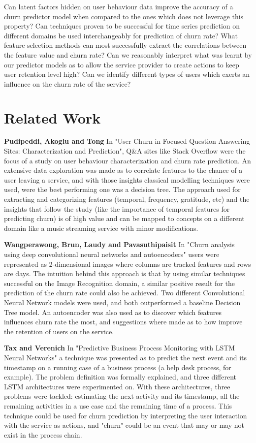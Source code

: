 \documentclass{kththesis}
\begin{document}
	Can latent factors hidden on user behaviour data improve the accuracy of a churn predictor model when compared to the ones which does not leverage this property? Can techniques proven to be successful for time series prediction on different domains be used interchangeably for prediction of churn rate? What feature selection methods can most successfully extract the correlations between the feature value and churn rate? Can we reasonably interpret what was learnt by our predictor models as to allow the service provider to create actions to keep user retention level high? Can we identify different types of users which exerts an influence on the churn rate of the service?

\chapter{Related Work}

\textbf{Pudipeddi, Akoglu and Tong} \citep{Pudipeddi2014} In "User Churn in Focused Question Answering Sites: Characterization and Prediction", Q\&A sites like Stack Overflow were the focus of a study on user behaviour characterization and churn rate prediction. An extensive data exploration was made as to correlate features to the chance of a user leaving a service, and with those insights classical modelling techniques were used, were the best performing one was a decision tree. The approach used for extracting and categorizing features (temporal, frequency, gratitude, etc) and the insights that follow the study (like the importance of temporal features for predicting churn) is of high value and can be mapped to concepts on a different domain like a music streaming service with minor modifications.

\textbf{Wangperawong, Brun, Laudy and Pavasuthipaisit} \citep{Wangperawong2016} In "Churn analysis using deep convolutional neural networks and autoencoders" users were represented as 2-dimensional images where columns are tracked features and rows are days. The intuition behind this approach is that by using similar techniques successful on the Image Recognition domain, a similar positive result for the prediction of the churn rate could also be achieved. Two different Convolutional Neural Network models were used, and both outperformed a baseline Decision Tree model. An autoencoder was also used as to discover which features influences churn rate the most, and suggestions where made as to how improve the retention of users on the service.

\textbf{Tax and Verenich} \citep{Tax2016} In "Predictive Business Process Monitoring with LSTM Neural Networks" a technique was presented as to predict the next event and its timestamp on a running case of a business process (a help desk process, for example). The problem definition was formally explained, and three different LSTM architectures were experimented on. With these architectures, three problems were tackled: estimating the next activity and its timestamp, all the remaining activities in a use case and the remaining time of a process. This technique could be used for churn prediction by interpreting the user interaction with the service as actions, and "churn" could be an event that may or may not exist in the process chain.
\end{document}
